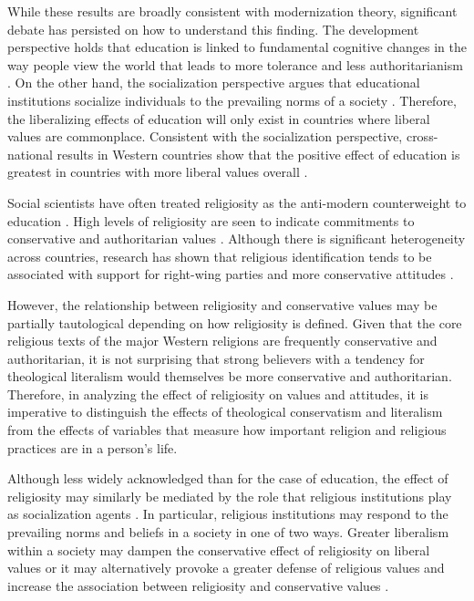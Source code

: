 \documentclass[10pt,letterpaper]{article}
\begin{document}
While these results are broadly consistent with modernization theory,
significant debate has persisted on how to understand this finding. The
development perspective holds that education is linked to fundamental
cognitive changes in the way people view the world that leads to more
tolerance and less authoritarianism
\cite{adorno_authoritarian_1950, mcclosky_dimensions_1983}. On the
other hand, the socialization perspective argues that educational
institutions socialize individuals to the prevailing norms of a society
\cite{selznick_tenacity_1969, jackman_education_1984, phelan_education_1995}.
Therefore, the liberalizing effects of education will only exist in
countries where liberal values are commonplace. Consistent with the
socialization perspective, cross-national results in Western countries
show that the positive effect of education is greatest in countries with
more liberal values overall \cite{weil_variable_1985}.

Social scientists have often treated religiosity as the anti-modern
counterweight to education \cite{schwadel_explaining_2015}. High levels
of religiosity are seen to indicate commitments to conservative and
authoritarian values
\cite{rokeach_part_1969, rokeach_part_1969a, wilcox_evangelicals_1990}.
Although there is significant heterogeneity across countries, research
has shown that religious identification tends to be associated with
support for right-wing parties and more conservative attitudes
\cite{wilcox_evangelicals_1990, kelley_class_1995, scheepers_religion_1998, karpov_religiosity_2002, norris_sacred_2011}.

However, the relationship between religiosity and conservative values
may be partially tautological depending on how religiosity is defined.
Given that the core religious texts of the major Western religions are
frequently conservative and authoritarian, it is not surprising that
strong believers with a tendency for theological literalism would
themselves be more conservative and authoritarian. Therefore, in
analyzing the effect of religiosity on values and attitudes, it is
imperative to distinguish the effects of theological conservatism and
literalism from the effects of variables that measure how important
religion and religious practices are in a person's life.

Although less widely acknowledged than for the case of education, the
effect of religiosity may similarly be mediated by the role that
religious institutions play as socialization agents
\cite{scheepers_education_2002}. In particular, religious institutions
may respond to the prevailing norms and beliefs in a society in one of
two ways. Greater liberalism within a society may dampen the
conservative effect of religiosity on liberal values or it may
alternatively provoke a greater defense of religious values and increase
the association between religiosity and conservative values
\cite{kelley_national_1997}.
\end{document}
